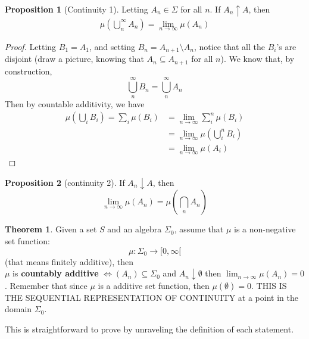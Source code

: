 \documentclass[12pt]{article}
\theoremstyle{definition}
\newtheorem{theorem}{Theorem}[section]
\newtheorem{proposition}{Proposition}[theorem]
\begin{document}
\begin{proposition}[Continuity 1]
Letting $A_n \in \Sigma$ for all $n$. If $A_n \uparrow A$, then 
\begin{align*}
	\mu\left(\bigcup_n^\infty A_n\right) = \lim_{n \to \infty} \mu(A_n)
\end{align*}
	\begin{proof}
		Letting $B_1 = A_1$, and setting $B_n = A_{n+1}\setminus A_n$, notice that all the $B_i$'s are disjoint (draw a picture, knowing that $A_n \subseteq A_{n+1}$ for all $n$). We know that, by construction, 
		\[
			\bigcup_n^\infty B_n = \bigcup_n^\infty A_n
		\]
		Then by countable additivity, we have 
		\begin{align*}
			\mu(\bigcup_i B_i) = \sum_i \mu(B_i) &= \lim_{n \to \infty} \sum_i^n \mu(B_i)\\
			&= \lim_{n \to \infty} \mu\left(\bigcup_i^n B_i\right)\\
			&= \lim_{n \to \infty} \mu(A_i) 
		\end{align*}
	\end{proof}
\end{proposition}
\begin{proposition}[continuity 2]
If $A_n \downarrow A$, then 
\[
	\lim_{n \to \infty} \mu(A_n) = \mu\left(\bigcap_n A_n\right)
\]
\end{proposition}

\begin{theorem}
Given a set $S$ and an algebra $\Sigma_0$, assume that $\mu$ is a non-negative set function:
$$\mu \colon \Sigma_0 \to [0,\infty[$$
(that means finitely additive), then \\
$\mu$ is \textbf{countably additive} $\iff (A_n) \subseteq \Sigma_0 $ and $A_n \downarrow \emptyset$ then $\lim_{n \to \infty} \mu(A_n) =0$. Remember that since $\mu$ is a additive set function, then $\mu(\emptyset) = 0$. THIS IS THE SEQUENTIAL REPRESENTATION OF CONTINUITY at a point in the domain $\Sigma_0$. 
\end{theorem}
This is straightforward to prove by unraveling the definition of each statement.
\end{document}
